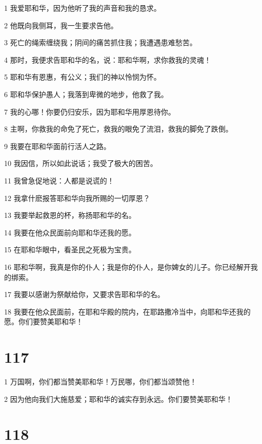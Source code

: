 \par 1 我爱耶和华，因为他听了我的声音和我的恳求。
\par 2 他既向我侧耳，我一生要求告他。
\par 3 死亡的绳索缠绕我；阴间的痛苦抓住我；我遭遇患难愁苦。
\par 4 那时，我便求告耶和华的名，说：耶和华啊，求你救我的灵魂！
\par 5 耶和华有恩惠，有公义；我们的神以怜悯为怀。
\par 6 耶和华保护愚人；我落到卑微的地步，他救了我。
\par 7 我的心哪！你要仍归安乐，因为耶和华用厚恩待你。
\par 8 主啊，你救我的命免了死亡，救我的眼免了流泪，救我的脚免了跌倒。
\par 9 我要在耶和华面前行活人之路。
\par 10 我因信，所以如此说话；我受了极大的困苦。
\par 11 我曾急促地说：人都是说谎的！
\par 12 我拿什麽报答耶和华向我所赐的一切厚恩？
\par 13 我要举起救恩的杯，称扬耶和华的名。
\par 14 我要在他众民面前向耶和华还我的愿。
\par 15 在耶和华眼中，看圣民之死极为宝贵。
\par 16 耶和华啊，我真是你的仆人；我是你的仆人，是你婢女的儿子。你已经解开我的绑索。
\par 17 我要以感谢为祭献给你，又要求告耶和华的名。
\par 18 我要在他众民面前，在耶和华殿的院内，在耶路撒冷当中，向耶和华还我的愿。你们要赞美耶和华！

\chapter{117}

\par 1 万国啊，你们都当赞美耶和华！万民哪，你们都当颂赞他！
\par 2 因为他向我们大施慈爱；耶和华的诚实存到永远。你们要赞美耶和华！

\chapter{118}

